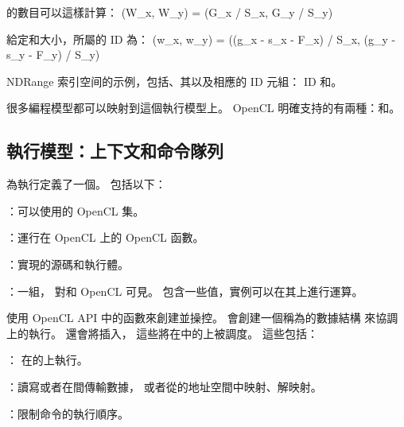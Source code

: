 的數目可以這樣計算：
\startformula
(W_x, W_y) = (G_x / S_x, G_y / S_y)
\stopformula

給定和大小，所屬的 ID 為：
\startformula
(w_x, w_y) = ((g_x - s_x - F_x) / S_x, (g_y - s_y - F_y) / S_y)
\stopformula

\startbuffer[buffigindexspacecaption]
NDRange 索引空间的示例，包括、其以及相應的 ID 元組：
 ID 和。
\stopbuffer
{}
{}

很多編程模型都可以映射到這個執行模型上。
 OpenCL 明確支持的有兩種：和。

\subsection[sec:exemodel:contextandcmdq]{執行模型：上下文和命令隊列}

為執行定義了一個。
包括以下：
\startigNum
\item {}：可以使用的 OpenCL 集。
\item {}：運行在 OpenCL 上的 OpenCL 函數。
\item {}：實現的源碼和執行體。
\item {}：一組，
對和 OpenCL 可見。
包含一些值，實例可以在其上進行運算。
\stopigBase

使用 OpenCL API 中的函數來創建並操控。
會創建一個稱為的數據結構
來協調上的執行。
還會將插入，
這些將在中的上被調度。
這些包括：
\startigBase
\item {}：
在的上執行。

\item {}：讀寫或者在間傳輸數據，
或者從的地址空間中映射、解映射。

\item {}：限制命令的執行順序。
\stopigBase

